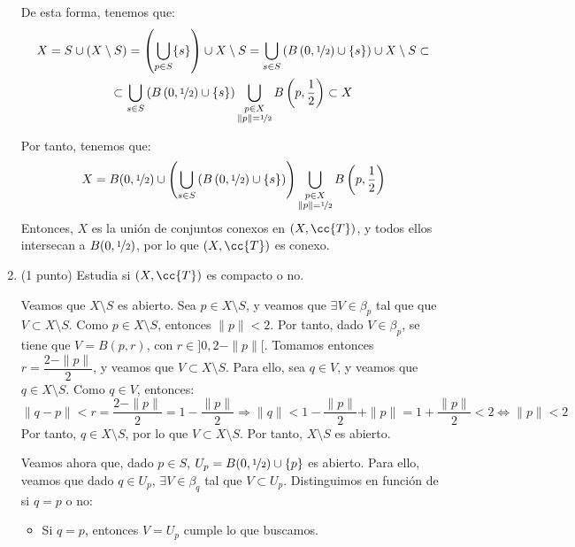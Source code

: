 \documentclass[12pt]{article}
\newcommand{\T}[0]{\cc{T}}
\begin{document}
\begin{ejercicio}[5 puntos]
\begin{enumerate}
          De esta forma, tenemos que:
          \begin{multline*}
            X = S\cup (X\setminus S) = \left(\bigcup_{p\in S} \{s\}\right) \cup X\setminus S=            
            \bigcup_{s\in S} \left(B\left(0, \nicefrac{1}{2}\right) \cup \{s\}\right)
            \cup X\setminus S \subset \\
            \subset \bigcup_{s\in S} \left(B\left(0, \nicefrac{1}{2}\right) \cup \{s\}\right)
            \bigcup_{\substack{p\in X\\ \|p\|=\nicefrac{1}{2}}} B\left(p, \frac{1}{2}\right)\subset X
          \end{multline*}

          Por tanto, tenemos que:
          \begin{equation*}
            X = B(0, \nicefrac{1}{2}) \cup
            \left(\bigcup_{s\in S} \left(B\left(0, \nicefrac{1}{2}\right) \cup \{s\}\right)\right)
            \bigcup_{\substack{p\in X\\ \|p\|=\nicefrac{1}{2}}} B\left(p, \frac{1}{2}\right)
          \end{equation*}
          Entonces, $X$ es la unión de conjuntos conexos en $(X,\T)$, y todos ellos intersecan a $B(0, \nicefrac{1}{2})$,
          por lo que $(X,\T)$ es conexo.
          
          
          \item(1 punto) Estudia si $(X,\T)$ es compacto o no.
          
          Veamos que $X\setminus S$ es abierto. Sea $p\in X\setminus S$, y veamos que $\exists V\in \beta_p$ tal que
          que $V\subset X\setminus S$. Como $p\in X\setminus S$, entonces $\|p\|<2$. Por tanto, dado $V\in \beta_p$,
          se tiene que $V=B(p,r)$, con $r\in ]0,2-\|p\|[$. Tomamos entonces $r=\dfrac{2-\|p\|}{2}$, y veamos que
          $V\subset X\setminus S$. Para ello, sea $q\in V$, y veamos que $q\in X\setminus S$. Como $q\in V$, entonces:
          \begin{equation*}
            \|q-p\| < r = \frac{2-\|p\|}{2} = 1 - \frac{\|p\|}{2} \Longrightarrow
            \|q\| < 1 - \frac{\|p\|}{2} + \|p\| = 1 + \frac{\|p\|}{2} < 2 \Longleftrightarrow \|p\| < 2
          \end{equation*}
          Por tanto, $q\in X\setminus S$, por lo que $V\subset X\setminus S$. Por tanto, $X\setminus S$ es abierto.

          Veamos ahora que, dado $p\in S$, $U_p = B(0, \nicefrac{1}{2})\cup \{p\}$ es abierto. Para ello, veamos que
          dado $q\in U_p$, $\exists V\in \beta_q$ tal que $V\subset U_p$. Distinguimos en función de si $q=p$ o no:
          \begin{itemize}
            \item Si $q=p$, entonces $V=U_p$ cumple lo que buscamos.


\end{itemize}
\end{enumerate}
\end{ejercicio}
\end{document}
